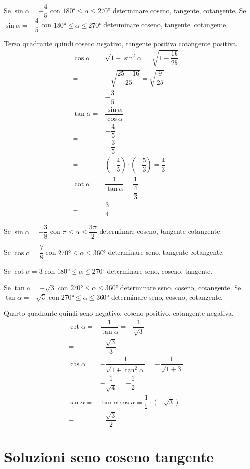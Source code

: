\begin{exercise}
	Se $\sin\alpha=-\dfrac{4}{5}$ con $\ang{180}\leq\alpha\leq\ang{270}$ determinare  coseno, tangente, cotangente.
	\tcblower	
Se $\sin\alpha=-\dfrac{4}{5}$ con $\ang{180}\leq\alpha\leq\ang{270}$ determinare  coseno, tangente, cotangente.
	
Terzo quadrante quindi coseno negativo, tangente positiva cotangente positiva.
	\begin{align*}
	\cos\alpha=&\sqrt{1-\sin^2\alpha}=\sqrt{1-\dfrac{16}{25}}\\
	=&-\sqrt{\dfrac{25-16}{25}}=\sqrt{\dfrac{9}{25}}\\
	=&-\dfrac{3}{5}\\
	\tan\alpha=&\dfrac{\sin\alpha}{\cos\alpha}\\
	=&\dfrac{-\dfrac{4}{5}}{-\dfrac{3}{5}}\\
	=&\left(-\dfrac{4}{5}\right)\cdot\left(-\dfrac{5}{3}\right)=\dfrac{4}{3}\\
	\cot\alpha=&\dfrac{1}{\tan\alpha}=\dfrac{1}{\dfrac{4}{3}}\\
	=&\dfrac{3}{4}
	\end{align*}	
\end{exercise}
\begin{exercise}[no solution]
	Se $\sin\alpha=-\dfrac{3}{8}$  con $\pi\leq\alpha\leq\dfrac{3\pi}{2}$ determinare coseno, tangente cotangente.
\end{exercise}
\begin{exercise}[no solution]
	Se $\cos\alpha=\dfrac{7}{8}$  con $\ang{270}\leq\alpha\leq\ang{360}$ determinare seno, tangente cotangente.
\end{exercise}
\begin{exercise}[no solution]
	Se $\cot\alpha=3$ con $\ang{180}\leq\alpha\leq\ang{270}$ determinare seno, coseno, tangente.
\end{exercise}
\begin{exercise}
	Se $\tan\alpha=-\sqrt{3}$ con $\ang{270}\leq\alpha\leq\ang{360}$ determinare seno, coseno, cotangente.
\tcblower	
	Se $\tan\alpha=-\sqrt{3}$ con $\ang{270}\leq\alpha\leq\ang{360}$ determinare seno, coseno, cotangente.

Quarto quadrante quindi seno negativo, coseno positivo, cotangente negativa.
\begin{align*}
\cot\alpha=&\dfrac{1}{\tan\alpha}=-\dfrac{1}{\sqrt{3}}\\
=&-\dfrac{\sqrt{3}}{3}\\
\cos\alpha=&-\dfrac{1}{\sqrt{1+\tan^2\alpha}}=-\dfrac{1}{\sqrt{1+3}}\\
=&-\dfrac{1}{\sqrt{4}}=-\dfrac{1}{2}\\
\sin\alpha=&\tan\alpha\cos\alpha=\dfrac{1}{2}\cdot\left(-\sqrt{3}\right)\\
=&-\dfrac{\sqrt{3}}{2}
\end{align*}	
\end{exercise}
\tcbstoprecording
\newpage
\section{Soluzioni seno coseno tangente}
\tcbinputrecords
